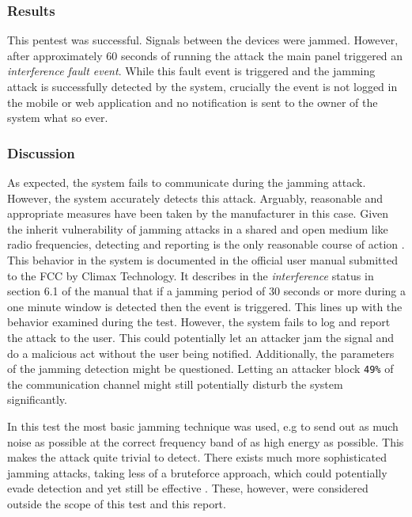 \subsubsection{Results}
This pentest was successful. Signals between the devices were jammed. However, after approximately 60 seconds of running the attack the main panel triggered an \textit{interference fault event}. While this fault event is triggered and the jamming attack is successfully detected by the system, crucially the event is not logged in the mobile or web application and no notification is sent to the owner of the system what so ever.

\subsubsection{Discussion}
As expected, the system fails to communicate during the jamming attack. However, the system accurately detects this attack. Arguably, reasonable and appropriate measures have been taken by the manufacturer in this case. Given the inherit vulnerability of jamming attacks in a shared and open medium like radio frequencies, detecting and reporting is the only reasonable course of action 
\cite{optimal-jamming-defense}. This behavior in the system is documented in the official user manual submitted to the FCC \cite{hsgw-user-manual} by Climax Technology. It describes in the \textit{interference} status in section 6.1 of the manual that if a jamming period of 30 seconds or more during a one minute window is detected then the event is triggered. This lines up with the behavior examined during the test. However, the system fails to log and report the attack to the user. This could potentially let an attacker jam the signal and do a malicious act without the user being notified. Additionally, the parameters of the jamming detection might be questioned. Letting an attacker block \texttt{49\%} of the communication channel might still potentially disturb the system significantly.

In this test the most basic jamming technique was used, e.g to send out as much noise as possible at the correct frequency band of as high energy as possible. This makes the attack quite trivial to detect. There exists much more sophisticated jamming attacks, taking less of a bruteforce approach, which could potentially evade detection and yet still be effective \cite{mpitziopoulos2009survey}. These, however, were considered outside the scope of this test and this report.
